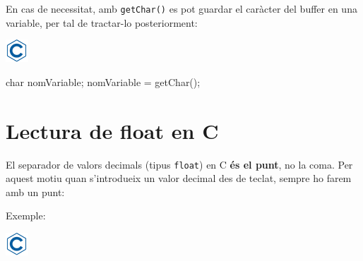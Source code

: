 \documentclass[]{book}
\newenvironment{Shaded}{\begin{snugshade}}{\end{snugshade}}
\newcommand{\DataTypeTok}[1]{\textcolor[rgb]{0.13,0.29,0.53}{#1}}
\newcommand{\DecValTok}[1]{\textcolor[rgb]{0.00,0.00,0.81}{#1}}
\newcommand{\SpecialCharTok}[1]{\textcolor[rgb]{0.00,0.00,0.00}{#1}}
\newcommand{\StringTok}[1]{\textcolor[rgb]{0.31,0.60,0.02}{#1}}
\newcommand{\ImportTok}[1]{#1}
\newcommand{\CommentTok}[1]{\textcolor[rgb]{0.56,0.35,0.01}{\textit{#1}}}
\newcommand{\ControlFlowTok}[1]{\textcolor[rgb]{0.13,0.29,0.53}{\textbf{#1}}}
\newcommand{\PreprocessorTok}[1]{\textcolor[rgb]{0.56,0.35,0.01}{\textit{#1}}}
\newcommand{\NormalTok}[1]{#1}
\begin{document}
En cas de necessitat, amb \texttt{getChar()} es pot guardar el caràcter
del buffer en una variable, per tal de tractar-lo posteriorment:

\includegraphics{./img/c.png}

\begin{Shaded}
\begin{Highlighting}[]
\DataTypeTok{char}\NormalTok{ nomVariable;}
\NormalTok{nomVariable = getChar();}
\end{Highlighting}
\end{Shaded}

\section{Lectura de float en C}\label{lectura-de-float-en-c}

El separador de valors decimals (tipus \texttt{float}) en C \textbf{és
el punt}, no la coma. Per aquest motiu quan s'introdueix un valor
decimal des de teclat, sempre ho farem amb un punt:

Exemple:

\includegraphics{./img/c.png}

\begin{Shaded}
\end{Shaded}
\end{document}
